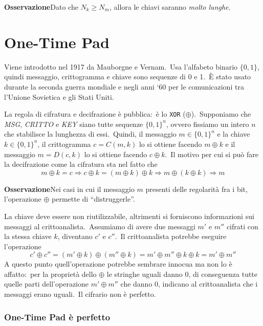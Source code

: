 \noindent\textbf{Osservazione}\quad Dato che $N_k \geq N_m$, allora le chiavi saranno \textit{molto lunghe}.\

\section{One-Time Pad}

Viene introdotto nel 1917 da Mauborgne e Vernam.\
Usa l'alfabeto binario $\{0, 1\}$, quindi messaggio, crittogramma e chiave sono sequenze di 0 e 1.\
È stato usato durante la seconda guerra mondiale e negli anni `60 per le comunicazioni tra l'Unione Sovietica e gli Stati Uniti.\

La regola di cifratura e decifrazione è pubblica:\ è lo \texttt{XOR} ($\oplus$).\
Supponiamo che \textit{MSG}, \textit{CRITTO} e \textit{KEY} siano tutte sequenze $\{0,1\}^n$, ovvero fissiamo un intero $n$ che stabilisce la lunghezza di essi.\
Quindi, il messaggio $m \in \{0,1\}^n$ e la chiave $k \in \{0,1\}^n$, il crittogramma $c = C(m, k)$ lo si ottiene facendo $m \oplus k$ e il messaggio $m = D(c, k)$ lo si ottiene facendo $c \oplus k$.\
Il motivo per cui si può fare la decifrazione come la cifratura sta nel fatto che
\[m \oplus k = c \Rightarrow c \oplus k = (m \oplus k) \oplus k \Rightarrow m \oplus (k \oplus k) \Rightarrow m \]

\vspace{12pt}
\noindent\textbf{Osservazione}\quad Nei casi in cui il messaggio $m$ presenti delle regolarità fra i bit, l'operazione $\oplus$ permette di ``distruggerle''.\
\vspace{12pt}

\noindent La chiave deve essere non riutilizzabile, altrimenti si forniscono informazioni sui messaggi al crittoanalista.\
Assumiamo di avere due messaggi $m'$ e $m''$ cifrati con la stessa chiave $k$, diventano $c'$ e $c''$.\
Il crittoanalista potrebbe eseguire l'operazione
\[c' \oplus c'' = (m' \oplus k) \oplus (m'' \oplus k) = m' \oplus m'' \oplus k \oplus k = m' \oplus m''\]
A questo punto quell'operazione potrebbe sembrare innocua ma non lo è affatto:\ per la proprietà dello $\oplus$ le stringhe uguali danno 0, di conseguenza tutte quelle parti dell'operazione $m' \oplus m''$ che danno 0, indicano al crittoanalista che i messaggi erano uguali.\
Il cifrario non è perfetto.

\subsubsection{One-Time Pad è perfetto}

